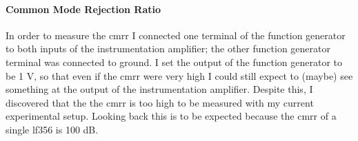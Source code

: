 \documentclass[justified,nobib]{tufte-handout}
\begin{document}
\paragraph{Common Mode Rejection Ratio} In order to measure the {\sc cmrr} I
connected one terminal of the function generator to both inputs of the
instrumentation amplifier; the other function generator terminal was connected
to ground. I set the output of the function generator to be 1 V, so that even if
the {\sc cmrr} were very high I could still expect to (maybe) see something at
the output of the instrumentation amplifier. Despite this, I discovered that the
the {\sc cmrr} is too high to be measured with my current experimental setup.
Looking back this is to be expected because the {\sc cmrr} of a single 
{\sc lf}356 is 100 dB.

{}

\end{document}
